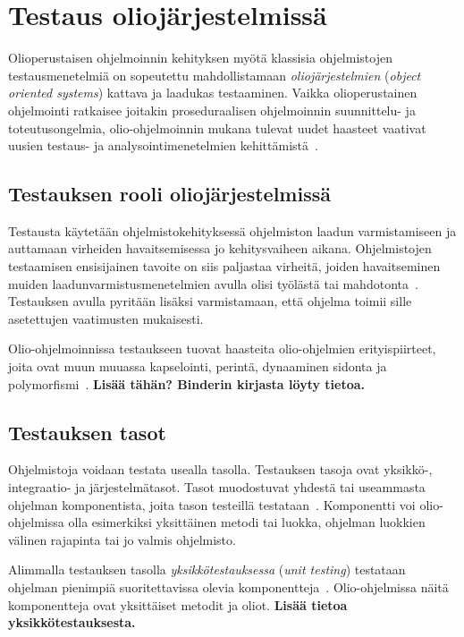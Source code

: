 \documentclass[finnish, grading]{tktltiki2}
\theoremstyle{definition}
\theoremstyle{remark}
\begin{document}


\section{Testaus oliojärjestelmissä}

Olioperustaisen ohjelmoinnin kehityksen myötä klassisia ohjelmistojen testausmenetelmiä on sopeutettu mahdollistamaan \textit{oliojärjestelmien} (\textit{object oriented systems}) kattava ja laadukas testaaminen. Vaikka olioperustainen ohjelmointi ratkaisee joitakin proseduraalisen ohjelmoinnin suunnittelu- ja toteutusongelmia, olio-ohjelmoinnin mukana tulevat uudet haasteet vaativat uusien testaus- ja analysointimenetelmien kehittämistä~\cite[s. 86]{Mariani:Pezze:2008}. 

\subsection{Testauksen rooli oliojärjestelmissä}

Testausta käytetään ohjelmistokehityksessä ohjelmiston laadun varmistamiseen ja auttamaan virheiden havaitsemisessa jo kehitysvaiheen aikana. Ohjelmistojen testaamisen ensisijainen tavoite on siis paljastaa virheitä, joiden havaitseminen muiden laadunvarmistusmenetelmien avulla olisi työlästä tai mahdotonta~\cite[s. 59]{Binder:1999}. Testauksen avulla pyritään lisäksi varmistamaan, että ohjelma toimii sille asetettujen vaatimusten mukaisesti. 

Olio-ohjelmoinnissa testaukseen tuovat haasteita olio-ohjelmien erityispiirteet, joita ovat muun muuassa kapselointi, perintä, dynaaminen sidonta ja polymorfismi~\cite[s. 86]{Mariani:Pezze:2008}. 
\textbf{Lisää tähän? Binderin kirjasta löyty tietoa.}


\subsection{Testauksen tasot}

Ohjelmistoja voidaan testata usealla tasolla. Testauksen tasoja ovat yksikkö-, integraatio- ja järjestelmätasot. Tasot muodostuvat yhdestä tai useammasta ohjelman komponentista, joita tason testeillä testataan~\cite[s. 45]{Binder:1999}. Komponentti voi olio-ohjelmissa olla esimerkiksi yksittäinen metodi tai luokka, ohjelman luokkien välinen rajapinta tai jo valmis ohjelmisto.

Alimmalla testauksen tasolla \textit{yksikkötestauksessa} (\textit{unit testing}) testataan ohjelman pienimpiä suoritettavissa olevia komponentteja~\cite[s. 45]{Binder:1999}. Olio-ohjelmissa näitä komponentteja ovat yksittäiset metodit ja oliot. 
\textbf{Lisää tietoa yksikkötestauksesta.}
\end{document}
